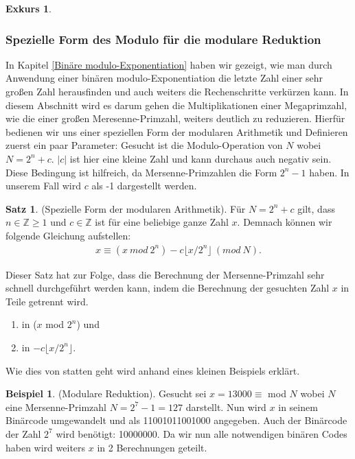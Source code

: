 \documentclass[12pt,a4paper]{article}
\theoremstyle{definition}
\newtheorem{satz}{Satz}[subsection]
\newtheorem{bsp}{Beispiel}[subsection]
\newtheorem{exkurs}{Exkurs}
\begin{document}
\begin{exkurs}
\subsubsection{Spezielle Form des Modulo für die modulare Reduktion}
In Kapitel \ref{Binäre modulo-Exponentiation} haben wir gezeigt, wie man durch Anwendung einer binären modulo-Exponentiation die letzte Zahl einer sehr großen Zahl herausfinden und auch weiters die Rechenschritte verkürzen kann.
In diesem Abschnitt wird es darum gehen die Multiplikationen einer Megaprimzahl, wie die einer großen Meresenne-Primzahl, weiters deutlich zu reduzieren.
Hierfür bedienen wir uns einer speziellen Form der modularen Arithmetik und Definieren zuerst ein paar Parameter:\newline
Gesucht ist die Modulo-Operation von $N$ wobei $N = 2^n + c$.\newline
$\vert c \vert$ ist hier eine kleine Zahl und kann durchaus auch negativ sein. Diese Bedingung ist hilfreich, da Mersenne-Primzahlen die Form $2^n-1$ haben.
In unserem Fall wird $c$ als -1 dargestellt werden.
\begin{satz}(Spezielle Form der modularen Arithmetik).\newline
Für $N = 2^n + c$ gilt, dass $n \in \mathbb{Z} \geq 1$ und $c \in \mathbb{Z}$ ist für eine beliebige ganze Zahl $x$.
Demnach können wir folgende Gleichung aufstellen:
\begin{align}
x \equiv (x\ mod\ 2^n) - c \lfloor x/2^n \rfloor\ (mod\ N).
\end{align}
\end{satz}
Dieser Satz hat zur Folge, dass die Berechnung der Mersenne-Primzahl sehr schnell durchgeführt werden kann, indem die Berechnung der gesuchten Zahl $x$ in Teile getrennt wird.
\begin{enumerate}
    \item in ($x$ mod $2^n$) und
    \item in $- c \lfloor x/2^n \rfloor$.
\end{enumerate}
Wie dies von statten geht wird anhand eines kleinen Beispiels erklärt.
\begin{bsp}(Modulare Reduktion).\newline
Gesucht sei $x = 13000 \equiv$ mod $N$ wobei $N$ eine Mersenne-Primzahl $N = 2^7 - 1 =127$ darstellt.
Nun wird $x$ in seinem Binärcode umgewandelt und als 11001011001000 angegeben.
Auch der Binärcode der Zahl $2^7$ wird benötigt: 10000000.
Da wir nun alle notwendigen binären Codes haben wird weiters $x$ in 2 Berechnungen geteilt.
\begin{enumerate}

\end{enumerate}
\end{bsp}
\end{exkurs}
\end{document}
